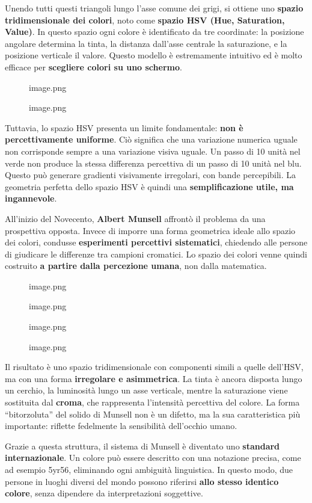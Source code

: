\documentclass[
]{article}
\begin{document}
Unendo tutti questi triangoli lungo l'asse comune dei grigi, si ottiene uno \textbf{spazio tridimensionale dei colori}, noto come \textbf{spazio HSV (Hue, Saturation, Value)}. In questo spazio ogni colore è identificato da tre coordinate: la posizione angolare determina la tinta, la distanza dall'asse centrale la saturazione, e la posizione verticale il valore. Questo modello è estremamente intuitivo ed è molto efficace per \textbf{scegliere colori su uno schermo}.

\begin{figure}
\centering
{image.png}
\caption{image.png}
\end{figure}

Tuttavia, lo spazio HSV presenta un limite fondamentale: \textbf{non è percettivamente uniforme}. Ciò significa che una variazione numerica uguale non corrisponde sempre a una variazione visiva uguale. Un passo di 10 unità nel verde non produce la stessa differenza percettiva di un passo di 10 unità nel blu. Questo può generare gradienti visivamente irregolari, con bande percepibili. La geometria perfetta dello spazio HSV è quindi una \textbf{semplificazione utile, ma ingannevole}.

All'inizio del Novecento, \textbf{Albert Munsell} affrontò il problema da una prospettiva opposta. Invece di imporre una forma geometrica ideale allo spazio dei colori, condusse \textbf{esperimenti percettivi sistematici}, chiedendo alle persone di giudicare le differenze tra campioni cromatici. Lo spazio dei colori venne quindi costruito \textbf{a partire dalla percezione umana}, non dalla matematica.

\begin{figure}
\centering
{image.png}
\caption{image.png}
\end{figure}

\begin{figure}
\centering
{image.png}
\caption{image.png}
\end{figure}

Il risultato è uno spazio tridimensionale con componenti simili a quelle dell'HSV, ma con una forma \textbf{irregolare e asimmetrica}. La tinta è ancora disposta lungo un cerchio, la luminosità lungo un asse verticale, mentre la saturazione viene sostituita dal \textbf{croma}, che rappresenta l'intensità percettiva del colore. La forma ``bitorzoluta'' del solido di Munsell non è un difetto, ma la sua caratteristica più importante: riflette fedelmente la sensibilità dell'occhio umano.

Grazie a questa struttura, il sistema di Munsell è diventato uno \textbf{standard internazionale}. Un colore può essere descritto con una notazione precisa, come ad esempio 5yr56, eliminando ogni ambiguità linguistica. In questo modo, due persone in luoghi diversi del mondo possono riferirsi \textbf{allo stesso identico colore}, senza dipendere da interpretazioni soggettive.
\end{document}
